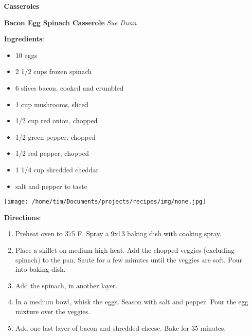 \documentclass[11pt, twoside, openany]{book}
\begin{document}
{\newpage \LARGE \textbf{Casseroles}} \label{casseroles}\vspace{4mm}\\
\noindent\begin{minipage}[t]{\linewidth}%
{\Large\textbf{Bacon Egg Spinach Casserole}} \label{bacon-egg-spinach-casserole}\hfill\textit{Sue Dunn}\\
\noindent\begin{minipage}[t]{0.78\linewidth}%
\textbf{Ingredients}:\vspace{-3mm}
\begin{multicols}{2}
\begin{itemize}\setlength\itemsep{-1mm}
\item 10 eggs
\item 2 1/2 cups frozen spinach
\item 6 slices bacon, cooked and crumbled
\item 1 cup mushrooms, sliced
\item 1/2 cup red onion, chopped
\item 1/2 green pepper, chopped
\item 1/2 red pepper, chopped
\item 1 1/4 cup shredded cheddar
\item salt and pepper to taste
\end{itemize}
\end{multicols}
\end{minipage}
\noindent\begin{minipage}[t]{0.18\linewidth}
\centering \strut\vspace*{-\baselineskip}\newline
\texttt{[image: /home/tim/Documents/projects/recipes/img/none.jpg]}\\
\end{minipage}\vspace{3mm}
\textbf{Directions}:
\vspace{-3mm}\begin{enumerate}\setlength\itemsep{-1mm}
\item Preheat oven to 375 F. Spray a 9x13 baking dish with cooking spray.
\item Place a skillet on medium-high heat. Add the chopped veggies (excluding spinach) to the pan. Saute for a few minutes until the veggies are soft. Pour into baking dish.
\item Add the spinach, in another layer. 
\item In a medium bowl, whisk the eggs. Season with salt and pepper. Pour the egg mixture over the veggies.
\item Add one last layer of bacon and shredded cheese. Bake for 35 minutes.
\end{enumerate}
\end{minipage}\vspace{8mm}
\end{document}

